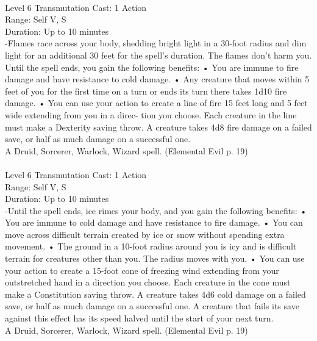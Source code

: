 \documentclass[10pt,twocolumn]{report}
\begin{document}
 \\
Level 6 \quad Transmutation \quad Cast: 1 Action\\
Range: Self \quad V, S\\
Duration: Up to 10 minutes \quad \\
-Flames race across your body, shedding bright light in a 30-foot radius and dim light for an additional 30 feet for the spell’s duration. The flames don’t harm you. Until the spell ends, you gain the following benefits:
• You are immune to fire damage and have resistance to cold damage.
• Any creature that moves within 5 feet of you for the first time on a turn or ends its turn there takes 1d10 fire damage.
• You can use your action to create a line of fire 15 feet long and 5 feet wide extending from you in a direc- tion you choose. Each creature in the line must make a Dexterity saving throw. A creature takes 4d8 fire damage on a failed save, or half as much damage on a successful one.\\
A Druid, Sorcerer, Warlock, Wizard spell. (Elemental Evil p. 19) \\


 \\
Level 6 \quad Transmutation \quad Cast: 1 Action\\
Range: Self \quad V, S\\
Duration: Up to 10 minutes \quad \\
-Until the spell ends, ice rimes your body, and you gain the following benefits:
• You are immune to cold damage and have resistance to fire damage.
• You can move across difficult terrain created by ice or snow without spending extra movement.
• The ground in a 10-foot radius around you is icy and is difficult terrain for creatures other than you. The radius moves with you.
• You can use your action to create a 15-foot cone of freezing wind extending from your outstretched hand in a direction you choose. Each creature in the cone must make a Constitution saving throw. A creature takes 4d6 cold damage on a failed save, or half as much damage on a successful one. A creature that fails its save against this effect has its speed halved until the start of your next turn.\\
A Druid, Sorcerer, Warlock, Wizard spell. (Elemental Evil p. 19) \\
\end{document}
